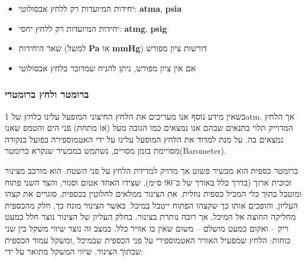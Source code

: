 \documentclass[
  hebrew,
  letterpaper,
  DIV=11,
  numbers=noendperiod]{scrreprt}
\providecommand{\tightlist}{%
  \setlength{\itemsep}{0pt}\setlength{\parskip}{0pt}}
\begin{document}
\begin{tcolorbox}[enhanced jigsaw, colback=white, arc=.35mm, coltitle=black, breakable, toptitle=1mm, leftrule=.75mm, colbacktitle=quarto-callout-note-color!10!white, opacitybacktitle=0.6, bottomtitle=1mm, titlerule=0mm, opacityback=0, colframe=quarto-callout-note-color-frame, title=\textcolor{quarto-callout-note-color}{\faInfo}\hspace{0.5em}{הערה}, rightrule=.15mm, bottomrule=.15mm, toprule=.15mm, left=2mm]

\begin{itemize}
\tightlist
\item
  יחידות המיועדות רק ללחץ אבסולוטי: \textbf{atma}, \textbf{psia}\\
\item
  יחידות המיועדות רק ללחץ יחסי: \textbf{atmg}, \textbf{psig}\\
\item
  שאר היחידות (למשל \textbf{Pa} או \textbf{mmHg}) דורשות ציון מפורש\\
\item
  אם אין ציון מפורש, ניתן להניח שמדובר בלחץ אבסולוטי
\end{itemize}

\end{tcolorbox}

\subsubsection{\texorpdfstring{{ברומטר ולחץ
ברומטרי}}{ברומטר ולחץ ברומטרי}}\label{ux5d1ux5e8ux5d5ux5deux5d8ux5e8-ux5d5ux5dcux5d7ux5e5-ux5d1ux5e8ux5d5ux5deux5d8ux5e8ux5d9}

{כשאין מידע נוסף אנו מעריכים את הלחץ החיצוני המופעל עלינו כלחץ של}
1atm{. אך הלחץ המדוייק תלוי בתנאים שבהם אנו נמצאים כמו הגובה מעל (או
מתחת) פני הים והטמפ\textquotesingle{} שאנו נמצאים בה. על מנת למדוד את
הלחץ המופעל עלינו על ידי האטמוספירה בפועל בנקודה מסויימת בזמן מסויים,}
{נשתמש במכשיר שנקרא {ברומטר}}{(Barometer){.}} {}

{ברומטר כספית הוא מכשיר פשוט אך מדויק למדידת הלחץ על פני השטח. הוא מורכב
מצינור זכוכית ארוך (בדרך כלל באורך של כ־90 ס״מ), שצידו האחד אטום וסגור},
{והצד השני פתוח ומוטבל בתוך כלי המכיל כספית נוזלית}. {את הצינור ממלאים
לחלוטין בכספית, סוגרים את קצהו העליון, והופכים אותו כך שקצהו הפתוח ייטבל
במיכל}. {כאשר הצינור מונח כך, חלק מהכספית מחליקה החוצה אל המיכל, אך רובה
נותרת בצינור}. {בחלק העליון של הצינור נוצר חלל כמעט ריק} -- {ואקום כמעט
מושלם} -- {משום שאין בו אוויר כלל}. {במצב זה נוצר שיווי משקל בין שני
כוחות}: {הלחץ שמפעיל האוויר האטמוספירי על פני הכספית שבמיכל} ,{ומשקל
עמוד הכספית שבתוך הצינור}. {שיווי המשקל מתואר על ידי}:
\end{document}
